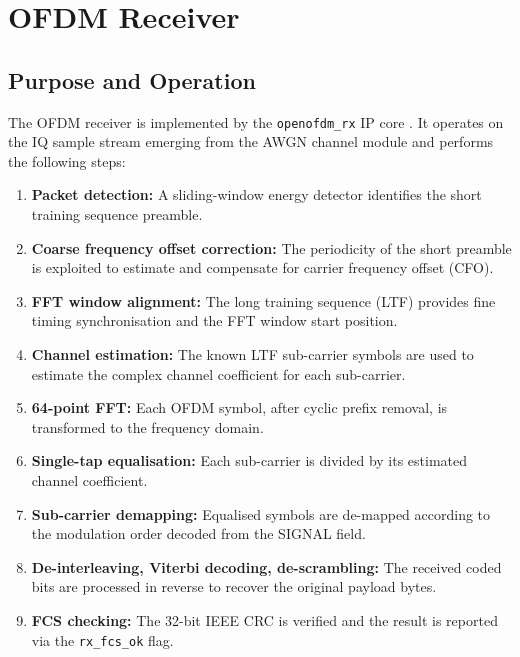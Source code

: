 \documentclass[12pt, a4paper, oneside]{report}
\begin{document}
\section{OFDM Receiver}

\subsection{Purpose and Operation}

The OFDM receiver is implemented by the \texttt{openofdm\_rx} IP core \cite{openofdm}. It operates on the IQ sample stream emerging from the AWGN channel module and performs the following steps:

\begin{enumerate}[noitemsep]
  \item \textbf{Packet detection:} A sliding-window energy detector identifies the short training sequence preamble.
  \item \textbf{Coarse frequency offset correction:} The periodicity of the short preamble is exploited to estimate and compensate for carrier frequency offset (CFO).
  \item \textbf{FFT window alignment:} The long training sequence (LTF) provides fine timing synchronisation and the FFT window start position.
  \item \textbf{Channel estimation:} The known LTF sub-carrier symbols are used to estimate the complex channel coefficient for each sub-carrier.
  \item \textbf{64-point FFT:} Each OFDM symbol, after cyclic prefix removal, is transformed to the frequency domain.
  \item \textbf{Single-tap equalisation:} Each sub-carrier is divided by its estimated channel coefficient.
  \item \textbf{Sub-carrier demapping:} Equalised symbols are de-mapped according to the modulation order decoded from the SIGNAL field.
  \item \textbf{De-interleaving, Viterbi decoding, de-scrambling:} The received coded bits are processed in reverse to recover the original payload bytes.
  \item \textbf{FCS checking:} The 32-bit IEEE CRC is verified and the result is reported via the \texttt{rx\_fcs\_ok} flag.
\end{enumerate}
\end{document}

